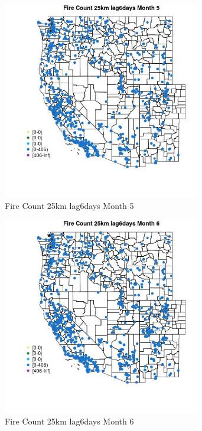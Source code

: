 \begin{figure} 
\centering  
\includegraphics[width=0.77\textwidth]{Code_Outputs/Report_ML_input_PM25_Step4_part_f_de_duplicated_aveswNAs_MapObsMo5Fire_Count_25km_lag6days.jpg} 
\caption{\label{fig:Report_ML_input_PM25_Step4_part_f_de_duplicated_aveswNAsMapObsMo5Fire_Count_25km_lag6days}Fire Count 25km lag6days Month 5} 
\end{figure} 
 

\begin{figure} 
\centering  
\includegraphics[width=0.77\textwidth]{Code_Outputs/Report_ML_input_PM25_Step4_part_f_de_duplicated_aveswNAs_MapObsMo6Fire_Count_25km_lag6days.jpg} 
\caption{\label{fig:Report_ML_input_PM25_Step4_part_f_de_duplicated_aveswNAsMapObsMo6Fire_Count_25km_lag6days}Fire Count 25km lag6days Month 6} 
\end{figure} 
 

